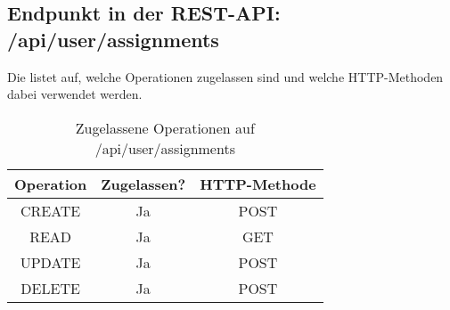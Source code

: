 \subsection{Endpunkt in der REST-API: /api/user/assignments}
Die  listet auf, welche Operationen zugelassen sind und welche HTTP-Methoden dabei verwendet werden. 

\begin{table}[!htbp]
	\begin{tabular}{|c|c|c|}
		\hline
			\textbf{Operation} & \textbf{Zugelassen?} & \textbf{HTTP-Methode} \\ \hline
			CREATE & Ja & POST \\ \hline 
			READ & Ja & GET \\ \hline
			UPDATE & Ja & POST \\ \hline 
			DELETE & Ja & POST \\ \hline
	\end{tabular}

		\caption{Zugelassene Operationen auf /api/user/assignments}
		\label{tab:end:rest:api:user:assignments:meth}
\end{table}


